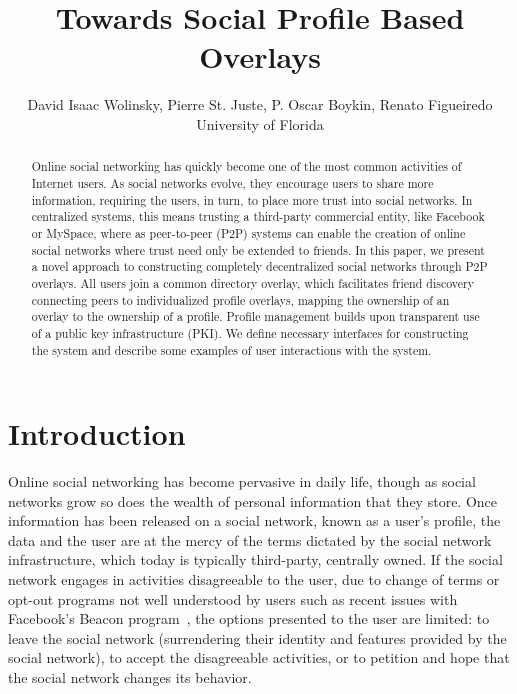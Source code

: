 \documentclass[conference]{IEEEtran}
\begin{document}
\title{Towards Social Profile Based Overlays}

\author{
David Isaac Wolinsky,
Pierre St. Juste,
P. Oscar Boykin,
Renato Figueiredo
\\
University of Florida
\\
}

\maketitle

\begin{abstract}

Online social networking has quickly become one of the most common activities
of Internet users.  As social networks evolve, they encourage users to share
more information, requiring the users, in turn, to place more trust into social
networks.  In centralized systems, this means trusting a third-party commercial
entity, like Facebook or MySpace, where as peer-to-peer (P2P) systems can
enable the creation of online social networks where trust need only be extended
to friends.  In this paper, we present a novel approach to constructing
completely decentralized social networks through P2P overlays.  All users join
a common directory overlay, which facilitates friend discovery connecting peers
to individualized profile overlays, mapping the ownership of an overlay to the
ownership of a profile.  Profile management builds upon transparent use of a
public key infrastructure (PKI).   We define necessary interfaces for
constructing the system and describe some examples of user interactions with
the system.

\end{abstract}

\section{Introduction}

Online social networking has become pervasive in daily life, though as social
networks grow so does the wealth of personal information that they store.
Once information has been released on a social network, known as a user's
profile, the data and the user are at the mercy of the terms dictated by the
social network infrastructure, which today is typically third-party, centrally
owned.  If the social network engages in activities disagreeable to the user,
due to change of terms or opt-out programs not well understood by users such
as recent issues with Facebook's Beacon program~\cite{facebook_beacon}, the
options presented to the user are limited: to leave the social network
(surrendering their identity and features provided by the social network), to
accept the disagreeable activities, or to petition and hope that the social
network changes its behavior. 
\end{document}
